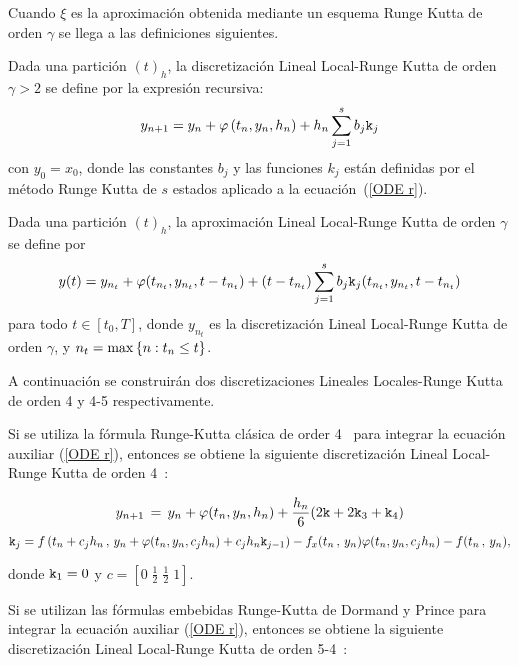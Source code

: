 Cuando $\xi$ es la aproximación obtenida mediante un esquema Runge Kutta de orden $\gamma$ se llega a las definiciones siguientes.
\begin{definition}
	\label{definition HLLD} \cite{Jimenez13} Dada una partición $(t)_{h}$, la discretización Lineal Local-Runge Kutta 
    de orden $\gamma >2$ se define por la expresión recursiva:
	\begin{equation*}
	y_{n+1}=y_{n}+\varphi \left( t_{n},y_{n},h_{n}\right) +h_{n}\sum_{j=1}^{s}b_{j}\mathtt{k}_{j}
	\end{equation*}%
	con $y_{0}=x_{0}$, donde las constantes $b_{j}$ y las funciones $k_{j}$ están definidas por el método Runge Kutta de $s$ estados aplicado a la ecuación~(\ref{ODE r}).
\end{definition}

\begin{definition}
	\label{definition HOLLA} \cite{Jimenez13} Dada una partición $(t)_{h}$, la aproximación Lineal Local-Runge Kutta de orden $\gamma$ se define por 
	\begin{equation*}
	y(t)=y_{n_{t}}+\varphi(t_{n_{t}},y_{n_{t}},t-t_{n_{t}})+(t-t_{n_{t}})%
	\sum_{j=1}^{s}b_{j}\kt_{j}(t_{n_{t}},y_{n_{t}},t-t_{n_{t}}) %
	\end{equation*}
	para todo $t\in[t_{0},T]$, donde $y_{n_{t}}$ es la discretización Lineal Local-Runge Kutta de orden $\gamma$, y $n_{t}=\max\left\{ n:t_{n}\leq t \right\}$.
\end{definition}
A continuación se construirán dos discretizaciones Lineales Locales-Runge Kutta de orden 4 y 4-5 respectivamente.

Si se utiliza la fórmula Runge-Kutta clásica de order 4~\cite{hairer1993solving} para integrar la ecuación auxiliar (\ref{ODE r}), entonces se obtiene la siguiente discretización Lineal Local-Runge Kutta de orden 4~\cite{Jimenez13}:

\begin{equation}
    y_{n+1}\,=\,y_n+\varphi(t_n,y_n,h_n)+\frac{h_n}{6}(2\mathtt{k}+2\mathtt{k}_3+\mathtt{k}_4)
    \label{LLDP scheme}
    \end{equation}
    \[ \mathtt{k}_j = f\left( t_n+c_jh_n\, , \, y_n+\varphi(t_n,y_n,c_jh_n)+c_jh_n\mathtt{k}_{j-1} \right)
- f_x(t_n\, , \, y_n)\varphi(t_n,y_n,c_jh_n) - f(t_n\, ,\, y_n) ,\]

donde $\mathtt{k}_1=0$ y $c = \left[ 0 \; \frac{1}{2} \; \frac{1}{2} \; 1  \right]$.

Si se utilizan las fórmulas embebidas Runge-Kutta de Dormand y Prince para integrar la ecuación auxiliar (\ref{ODE r}), entonces se obtiene la siguiente discretización Lineal Local-Runge Kutta de orden 5-4~\cite{Jimenez14AMC}:

